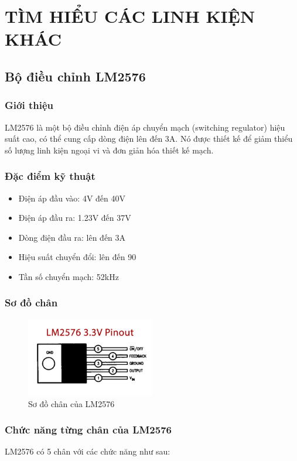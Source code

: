 \chapter{TÌM HIỂU CÁC LINH KIỆN KHÁC}
    \section{Bộ điều chỉnh LM2576}
        \subsection{Giới thiệu}
            \hspace*{0.6cm}LM2576 là một bộ điều chỉnh điện áp chuyển mạch (switching regulator) hiệu suất cao, có thể cung cấp dòng điện lên đến 3A. Nó được thiết kế để giảm thiểu số lượng linh kiện ngoại vi và đơn giản hóa thiết kế mạch.
        \subsection{Đặc điểm kỹ thuật}
            \begin{itemize}
                \item Điện áp đầu vào: 4V đến 40V
                \item Điện áp đầu ra: 1.23V đến 37V
                \item Dòng điện đầu ra: lên đến 3A
                \item Hiệu suất chuyển đổi: lên đến 90%
                \item Tần số chuyển mạch: 52kHz
            \end{itemize}   
        \subsection{Sơ đồ chân}
            \begin{figure}[H]
                \centering
                \includegraphics[width=0.5\textwidth]{pictures/lm2576_pinout.png}
                \caption{Sơ đồ chân của LM2576}
            \end{figure}
        \subsection{Chức năng từng chân của LM2576}
            LM2576 có 5 chân với các chức năng như sau:
            
